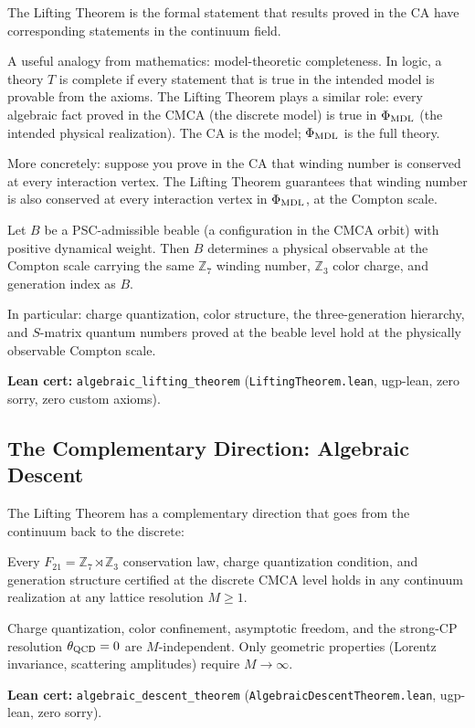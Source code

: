 \documentclass[11pt,a4paper]{article}
\newcommand{\lean}[1]{\texttt{#1}}
\newcommand{\PhiMDL}{\Phi_{\rm MDL}}
\newcommand{\ZS}{\mathbb{Z}_7}
\theoremstyle{definition}
\begin{document}
The Lifting Theorem is the formal statement that results proved in the CA
have corresponding statements in the continuum field.

A useful analogy from mathematics: model-theoretic completeness.
In logic, a theory $T$ is complete if every statement that is true in the
intended model is provable from the axioms.
The Lifting Theorem plays a similar role: every algebraic fact proved in the
CMCA (the discrete model) is true in $\PhiMDL$ (the intended physical realization).
The CA is the model; $\PhiMDL$ is the full theory.

More concretely: suppose you prove in the CA that winding number is conserved
at every interaction vertex.  The Lifting Theorem guarantees that winding number
is also conserved at every interaction vertex in $\PhiMDL$, at the Compton scale.

\begin{tcolorbox}[colback=boxgreen,colframe=green!50!black,
  title={Theorem: Algebraic Lifting (machine-certified, zero sorry, zero custom axioms)}]
Let $B$ be a PSC-admissible beable (a configuration in the CMCA orbit) with
positive dynamical weight.
Then $B$ determines a physical observable at the Compton scale carrying the same
$\ZS$ winding number, $\mathbb{Z}_3$ color charge, and generation index as $B$.

In particular: charge quantization, color structure, the three-generation
hierarchy, and $S$-matrix quantum numbers proved at the beable level hold at the
physically observable Compton scale.

\smallskip\noindent
\textbf{Lean cert:} \lean{algebraic\_lifting\_theorem}
(\lean{LiftingTheorem.lean}, ugp-lean, zero sorry, zero custom axioms).
\end{tcolorbox}

\subsection{The Complementary Direction: Algebraic Descent}

The Lifting Theorem has a complementary direction that goes from the
continuum back to the discrete:

\begin{tcolorbox}[colback=boxblue,colframe=blue!40!black,
  title={Theorem: Algebraic Descent (machine-certified, zero sorry)}]
Every $F_{21} = \ZS \rtimes \mathbb{Z}_3$ conservation law, charge quantization
condition, and generation structure certified at the discrete CMCA level holds in
any continuum realization at any lattice resolution $M \geq 1$.

Charge quantization, color confinement, asymptotic freedom, and the strong-CP
resolution $\theta_{\rm QCD} = 0$ are $M$-independent.
Only geometric properties (Lorentz invariance, scattering amplitudes) require
$M \to \infty$.

\smallskip\noindent
\textbf{Lean cert:} \lean{algebraic\_descent\_theorem}
(\lean{AlgebraicDescentTheorem.lean}, ugp-lean, zero sorry).
\end{tcolorbox}
\end{document}
